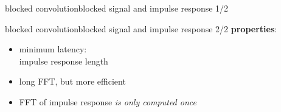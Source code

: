 \begin{frame}{blocked convolution}{blocked signal and impulse response 1/2}
{\begin{figure}
		\end{figure}
		}
		\vspace{50mm}
	\end{frame}

	\begin{frame}{blocked convolution}{blocked signal and impulse response 2/2}
		\textbf{properties}:
		\begin{itemize}
			\item	minimum latency:\\ impulse response length
			\smallskip
            \item	long FFT, but more efficient
			\smallskip
			\item	FFT of impulse response \textit{is only computed once}
		\end{itemize}
	\end{frame}

